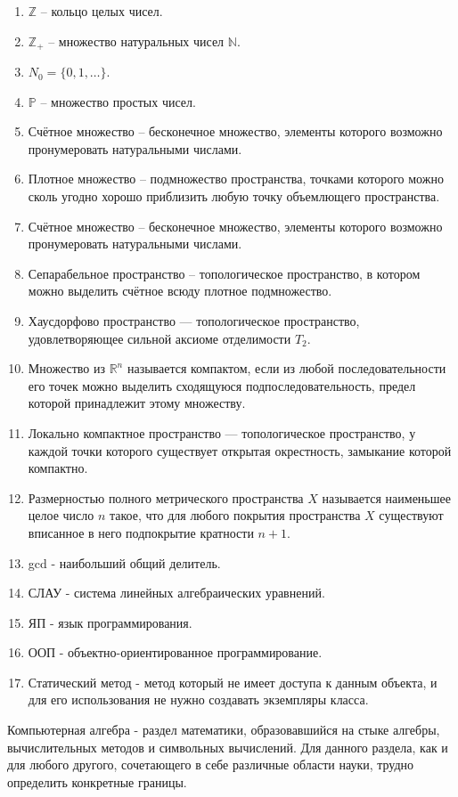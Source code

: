 \documentclass[master, och, diploma, times]{sty/SCWorks}
\theoremstyle{plain}
\theoremstyle{definition}
\numberwithin{equation}{section}
\begin{document}
\begin{enumerate}
	\item $\mathbb {Z}$ -- кольцо целых чисел.
	\item $\mathbb {Z}_{+}$ -- множество натуральных чисел $\mathbb {N}$.
	\item ${N}_0=\{0,1,\dots\}$.
	\item $\mathbb {P}$ -- множество простых чисел.
	\item Счётное множество -- бесконечное множество, элементы которого возможно пронумеровать натуральными числами.
	\item Плотное множество -- подмножество пространства, точками которого можно сколь угодно хорошо приблизить любую точку объемлющего пространства.
	\item Счётное множество -- бесконечное множество, элементы которого возможно пронумеровать натуральными числами.
	\item Сепарабельное пространство -- топологическое пространство, в котором можно выделить счётное всюду плотное подмножество.
	\item Хаусдорфово пространство — топологическое пространство, удовлетворяющее сильной аксиоме отделимости $T_2$.
	\item Множество из $\mathbb {R}^n$ называется компактом, если из любой последовательности его точек можно выделить сходящуюся подпоследовательность, предел которой принадлежит этому множеству.
	\item Локально компактное пространство — топологическое пространство, у каждой точки которого существует открытая окрестность, замыкание которой компактно.
	\item Размерностью полного метрического пространства $X$ называется наименьшее целое число $n$ такое, что для любого покрытия пространства $X$ существуют вписанное в него подпокрытие кратности $n+1$.
	\item gcd - наибольший общий делитель.
	\item СЛАУ - система линейных алгебраических уравнений.
	\item ЯП - язык программирования.
	\item ООП - объектно-ориентированное программирование.
	\item Статический метод - метод который не имеет доступа к данным объекта, и для его использования не нужно создавать экземпляры класса.
\end{enumerate}

\intro

Компьютерная алгебра -  раздел математики, образовавшийся на стыке алгебры, вычислительных методов и символьных вычислений. Для данного раздела, как и для любого другого, сочетающего в себе различные области науки, трудно определить конкретные границы.
\end{document}
